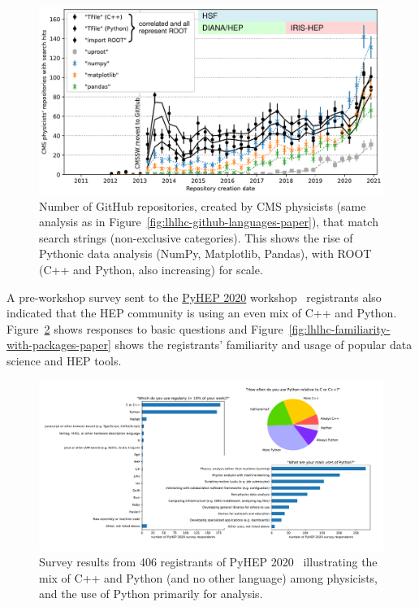\documentclass[12pt,a4paper]{article}
\begin{document}
\begin{figure}
\centering
\includegraphics[width=0.8\linewidth]{fig/lhlhc-github-overlay-lin-paper.pdf}

\caption{Number of GitHub repositories, created by CMS physicists (same analysis as in Figure~\ref{fig:lhlhc-github-languages-paper}), that match search strings (non-exclusive categories). This shows the rise of Pythonic data analysis (NumPy, Matplotlib, Pandas), with ROOT (C++ and Python, also increasing) for scale. \label{fig:lhlhc-github-overlay-lin-paper}}
\end{figure}

A pre-workshop survey sent to the \href{https://indico.cern.ch/e/PyHEP2020}{PyHEP 2020} workshop~\cite{PyHEP2020} registrants also indicated that the HEP community is using an even mix of C++ and Python. Figure~\ref{fig:pyhep2020-survey-paper} shows responses to basic questions and Figure~\ref{fig:lhlhc-familiarity-with-packages-paper} shows the registrants' familiarity and usage of popular data science and HEP tools.

\begin{figure}
\centering
\mbox{\hspace{-0.15\linewidth}\includegraphics[width=1.15\linewidth]{fig/pyhep2020-survey-paper.pdf}}

\caption{Survey results from 406 registrants of PyHEP 2020~\cite{PyHEP2020} illustrating the mix of C++ and Python (and no other language) among physicists, and the use of Python primarily for analysis. \label{fig:pyhep2020-survey-paper}}
\end{figure}
\end{document}
